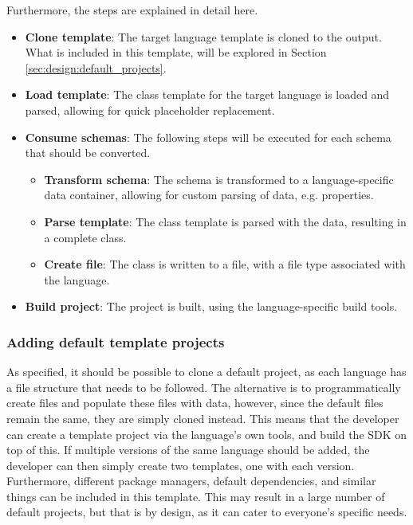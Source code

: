 \noindent
Furthermore, the steps are explained in detail here.
\begin{itemize}
    \item \textbf{Clone template}: The target language template is cloned to the output. What is included in this template, will be explored in Section \ref{sec:design:default_projects}.
    \item \textbf{Load template}: The class template for the target language is loaded and parsed, allowing for quick placeholder replacement.
    \item \textbf{Consume schemas}: The following steps will be executed for each schema that should be converted.
    \begin{itemize}
        \item \textbf{Transform schema}: The schema is transformed to a language-specific data container, allowing for custom parsing of data, e.g. properties.
        \item \textbf{Parse template}: The class template is parsed with the data, resulting in a complete class.
        \item \textbf{Create file}: The class is written to a file, with a file type associated with the language.
    \end{itemize}
    \item \textbf{Build project}: The project is built, using the language-specific build tools.
\end{itemize}


\subsubsection{Adding default template projects \label{sec:design:default_projects}}
As specified, it should be possible to clone a default project, as each language has a file structure that needs to be followed. The alternative is to programmatically create files and populate these files with data, however, since the default files remain the same, they are simply cloned instead.
This means that the developer can create a template project via the language's own tools, and build the SDK on top of this. If multiple versions of the same language should be added, the developer can then simply create two templates, one with each version. Furthermore, different package managers, default dependencies, and similar things can be included in this template. This may result in a large number of default projects, but that is by design, as it can cater to everyone's specific needs.


